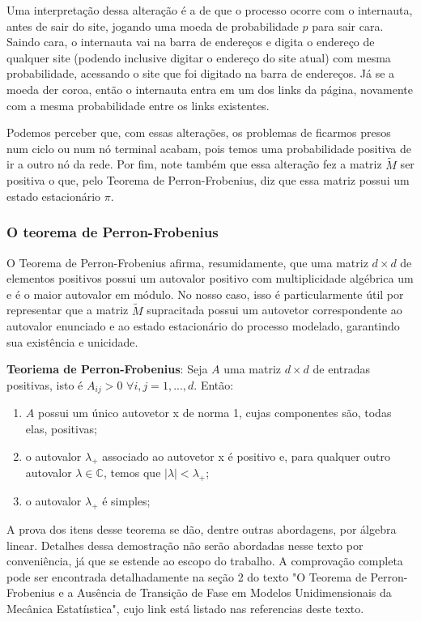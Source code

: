 \documentclass{article}
\begin{document}
Uma interpretação dessa alteração é a de que o processo ocorre com o internauta, antes de sair do site, jogando uma moeda de probabilidade $p$ para sair cara. Saindo cara, o internauta vai na barra de endereços e digita o endereço de qualquer site (podendo inclusive digitar o endereço do site atual) com mesma probabilidade, acessando o site que foi digitado na barra de endereços. Já se a moeda der coroa, então o internauta entra em um dos links da página, novamente com a mesma probabilidade entre os links existentes.

Podemos perceber que, com essas alterações, os problemas de ficarmos presos num ciclo ou num nó terminal acabam, pois temos uma probabilidade positiva de ir a outro nó da rede. Por fim, note também que essa alteração fez a matriz $\tilde{M}$ ser positiva o que, pelo Teorema de Perron-Frobenius, diz que essa matriz possui um estado estacionário $\pi$.

\subsubsection*{O teorema de Perron-Frobenius}

O Teorema de Perron-Frobenius afirma, resumidamente, que uma matriz $d \times d$ de elementos positivos possui um autovalor positivo com multiplicidade algébrica um e é o maior autovalor em módulo. No nosso caso, isso é particularmente útil por representar que a matriz $\tilde{M}$ supracitada possui um autovetor correspondente ao autovalor enunciado e ao estado estacionário do processo modelado, garantindo sua existência e unicidade.


\noindent
\textbf{Teoriema de Perron-Frobenius}: Seja $A$ uma matriz $d \times d$ de entradas positivas, isto é $A_{ij}>0$ $\forall i,j=1,...,d$. Então:


\begin{enumerate}
    \item $A$ possui um único autovetor x de norma 1, cujas componentes são, todas elas, positivas;
    \item o autovalor $\lambda_+$ associado ao autovetor x é positivo e, para qualquer outro autovalor $\lambda \in \mathbb{C}$, temos que $|\lambda| < \lambda_+$;
    \item o autovalor $\lambda_+$ é simples;
\end{enumerate}


A prova dos itens desse teorema se dão, dentre outras abordagens, por álgebra linear. Detalhes dessa demostração não serão abordadas nesse texto por conveniência, já que se estende ao escopo do trabalho. A comprovação completa pode ser encontrada detalhadamente na seção 2 do texto "O Teorema de Perron-Frobenius e a Ausência de Transição
de Fase em Modelos Unidimensionais da Mecânica
Estatíıstica"\cite{perron-frobenius}, cujo link está listado nas referencias deste texto.
\end{document}
